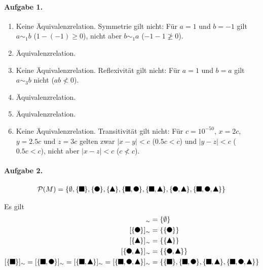 \documentclass{article}
\newcommand{\R}{\mathbb{R}\ \\\ \{0\}}
\newcommand{\frectangle}{\tikz[scale=0.7, baseline]{\draw[fill] (0, 0) rectangle (1em, 1em)}}
\newcommand{\fcircle}   {\tikz[scale=0.7, baseline]{\draw[fill] (0.5em, 0.5em) circle [radius=0.5em]}}
\newcommand{\ftriangle} {\tikz[scale=0.7, baseline]{\draw[fill] (0, 0) -- (0.5em, 1em) -- (1em, 0) -- cycle}}
\begin{document}
\paragraph{Aufgabe 1.}

\begin{enumerate}[label=\alph*)]
    \item Keine Äquivalenzrelation. Symmetrie gilt nicht: Für $a = 1$ und $b = -1$ gilt $a \sim_1 b$ ($1 - (-1) \geq 0$), nicht aber $b \sim_1 a$ ($-1 - 1 \ngeq 0$).
    
    \item Äquivalenzrelation.
    
    \item Keine Äquivalenzrelation. Reflexivität gilt nicht: Für $a = 1$ und $b = a$ gilt $a \sim_3 b$ nicht ($ab \nless 0$).

    \item Äquivalenzrelation.
    
    \item Äquivalenzrelation.
    
    \item Keine Äquivalenzrelation. Transitivität gilt nicht: Für $c = 10^{-50}$, $x = 2c$, $y = 2.5c$ und $z = 3c$ gelten zwar $\lvert x - y \rvert < c$ ($0.5c < c$) und $\vert y - z \rvert < c$ ($0.5c < c$), nicht aber $\lvert x - z \rvert < c$ ($c \nless c$).
\end{enumerate}

\paragraph{Aufgabe 2.}

\begin{align*}
    \mathcal{P}(M) = \{ \emptyset, \{\frectangle\}, \{\fcircle\}, \{\ftriangle\}, \{\frectangle, \fcircle\}, \{\frectangle, \ftriangle\}, \{\fcircle, \ftriangle\}, \{\frectangle, \fcircle, \ftriangle\} \}
\end{align*}

Es gilt
\begin{align*}
    [\emptyset]_{\sim}                                  &= \{ \emptyset \} \\
    [\{ \fcircle \}]_{\sim}                             &= \{ \{\fcircle\} \} \\
    [\{ \ftriangle \}]_{\sim}                           &= \{ \{\ftriangle\} \} \\
    [\{ \fcircle, \ftriangle \}]_{\sim}                 &= \{ \{\fcircle, \ftriangle\} \} \\
    [\{ \frectangle \}]_{\sim} = [\{ \frectangle, \fcircle \}]_{\sim} = [\{ \frectangle, \ftriangle \}]_{\sim} = [\{ \frectangle, \fcircle, \ftriangle \}]_{\sim}                     &= \{ \{\frectangle\}, \{\frectangle, \fcircle\}, \{\frectangle, \ftriangle\}, \{\frectangle, \fcircle, \ftriangle\} \}
\end{align*}
\end{document}
